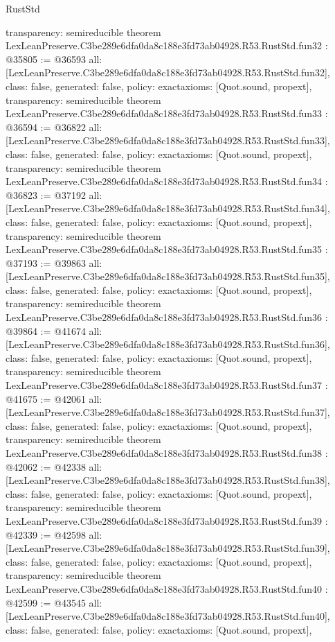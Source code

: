 \begin{lexlean}{RustStd}
\begin{coremodule}
{  transparency: semireducible
}
theorem LexLeanPreserve.C3be289e6dfa0da8c188e3fd73ab04928.R53.RustStd.fun32 : @35805 := @36593 {
  all: [LexLeanPreserve.C3be289e6dfa0da8c188e3fd73ab04928.R53.RustStd.fun32],
  class: false,
  generated: false,
  policy: exact{axioms: [Quot.sound, propext]},
  transparency: semireducible
}
theorem LexLeanPreserve.C3be289e6dfa0da8c188e3fd73ab04928.R53.RustStd.fun33 : @36594 := @36822 {
  all: [LexLeanPreserve.C3be289e6dfa0da8c188e3fd73ab04928.R53.RustStd.fun33],
  class: false,
  generated: false,
  policy: exact{axioms: [Quot.sound, propext]},
  transparency: semireducible
}
theorem LexLeanPreserve.C3be289e6dfa0da8c188e3fd73ab04928.R53.RustStd.fun34 : @36823 := @37192 {
  all: [LexLeanPreserve.C3be289e6dfa0da8c188e3fd73ab04928.R53.RustStd.fun34],
  class: false,
  generated: false,
  policy: exact{axioms: [Quot.sound, propext]},
  transparency: semireducible
}
theorem LexLeanPreserve.C3be289e6dfa0da8c188e3fd73ab04928.R53.RustStd.fun35 : @37193 := @39863 {
  all: [LexLeanPreserve.C3be289e6dfa0da8c188e3fd73ab04928.R53.RustStd.fun35],
  class: false,
  generated: false,
  policy: exact{axioms: [Quot.sound, propext]},
  transparency: semireducible
}
theorem LexLeanPreserve.C3be289e6dfa0da8c188e3fd73ab04928.R53.RustStd.fun36 : @39864 := @41674 {
  all: [LexLeanPreserve.C3be289e6dfa0da8c188e3fd73ab04928.R53.RustStd.fun36],
  class: false,
  generated: false,
  policy: exact{axioms: [Quot.sound, propext]},
  transparency: semireducible
}
theorem LexLeanPreserve.C3be289e6dfa0da8c188e3fd73ab04928.R53.RustStd.fun37 : @41675 := @42061 {
  all: [LexLeanPreserve.C3be289e6dfa0da8c188e3fd73ab04928.R53.RustStd.fun37],
  class: false,
  generated: false,
  policy: exact{axioms: [Quot.sound, propext]},
  transparency: semireducible
}
theorem LexLeanPreserve.C3be289e6dfa0da8c188e3fd73ab04928.R53.RustStd.fun38 : @42062 := @42338 {
  all: [LexLeanPreserve.C3be289e6dfa0da8c188e3fd73ab04928.R53.RustStd.fun38],
  class: false,
  generated: false,
  policy: exact{axioms: [Quot.sound, propext]},
  transparency: semireducible
}
theorem LexLeanPreserve.C3be289e6dfa0da8c188e3fd73ab04928.R53.RustStd.fun39 : @42339 := @42598 {
  all: [LexLeanPreserve.C3be289e6dfa0da8c188e3fd73ab04928.R53.RustStd.fun39],
  class: false,
  generated: false,
  policy: exact{axioms: [Quot.sound, propext]},
  transparency: semireducible
}
theorem LexLeanPreserve.C3be289e6dfa0da8c188e3fd73ab04928.R53.RustStd.fun40 : @42599 := @43545 {
  all: [LexLeanPreserve.C3be289e6dfa0da8c188e3fd73ab04928.R53.RustStd.fun40],
  class: false,
  generated: false,
  policy: exact{axioms: [Quot.sound, propext]},
}
\end{coremodule}
\end{lexlean}
